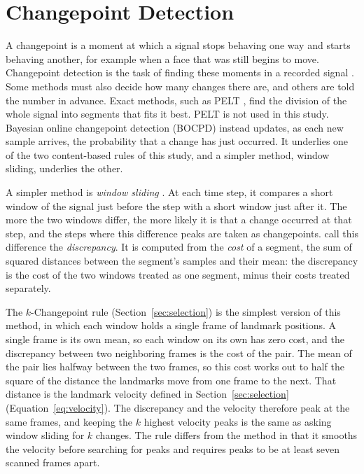 
\section{Changepoint Detection}
\label{sec:changepoint}

A changepoint is a moment at which a signal stops behaving one way and starts behaving another, for example when a face that was still begins to move. Changepoint detection is the task of finding these moments in a recorded signal \cite{truong2020}. Some methods must also decide how many changes there are, and others are told the number in advance. Exact methods, such as PELT \cite{killick2012}, find the division of the whole signal into segments that fits it best. PELT is not used in this study. Bayesian online changepoint detection (BOCPD) \cite{adams2007} instead updates, as each new sample arrives, the probability that a change has just occurred. It underlies one of the two content-based rules of this study, and a simpler method, window sliding, underlies the other.

A simpler method is \emph{window sliding} \cite[Section~5.2.1]{truong2020}. At each time step, it compares a short window of the signal just before the step with a short window just after it. The more the two windows differ, the more likely it is that a change occurred at that step, and the steps where this difference peaks are taken as changepoints.  call this difference the \emph{discrepancy}. It is computed from the \emph{cost} of a segment, the sum of squared distances between the segment's samples and their mean: the discrepancy is the cost of the two windows treated as one segment, minus their costs treated separately.

The $k$-Changepoint rule (Section~\ref{sec:selection}) is the simplest version of this method, in which each window holds a single frame of landmark positions. A single frame is its own mean, so each window on its own has zero cost, and the discrepancy between two neighboring frames is the cost of the pair. The mean of the pair lies halfway between the two frames, so this cost works out to half the square of the distance the landmarks move from one frame to the next. That distance is the landmark velocity defined in Section~\ref{sec:selection} (Equation~\ref{eq:velocity}). The discrepancy and the velocity therefore peak at the same frames, and keeping the $k$ highest velocity peaks is the same as asking window sliding for $k$ changes. The rule differs from the method in that it smooths the velocity before searching for peaks and requires peaks to be at least seven scanned frames apart.

